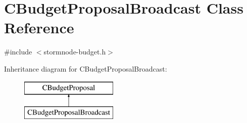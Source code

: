 \hypertarget{class_c_budget_proposal_broadcast}{}\section{C\+Budget\+Proposal\+Broadcast Class Reference}
\label{class_c_budget_proposal_broadcast}


{\ttfamily \#include $<$stormnode-\/budget.\+h$>$}

Inheritance diagram for C\+Budget\+Proposal\+Broadcast\+:\begin{figure}[H]
\begin{center}
\leavevmode
\includegraphics[height=2.000000cm]{class_c_budget_proposal_broadcast}
\end{center}
\end{figure}
